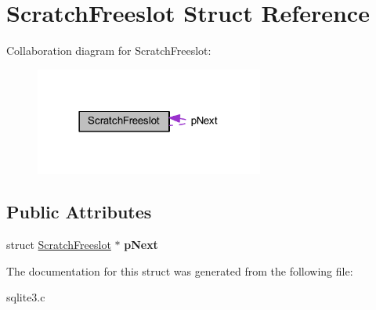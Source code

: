 \hypertarget{struct_scratch_freeslot}{\section{Scratch\-Freeslot Struct Reference}
\label{struct_scratch_freeslot}
}


Collaboration diagram for Scratch\-Freeslot\-:\nopagebreak
\begin{figure}[H]
\begin{center}
\leavevmode
\includegraphics[width=213pt]{struct_scratch_freeslot__coll__graph}
\end{center}
\end{figure}
\subsection*{Public Attributes}
\begin{DoxyCompactItemize}
\item 
\hypertarget{struct_scratch_freeslot_aca5c55a56a2a63a5be0756707a04bee8}{struct \hyperlink{struct_scratch_freeslot}{Scratch\-Freeslot} $\ast$ {\bfseries p\-Next}}\label{struct_scratch_freeslot_aca5c55a56a2a63a5be0756707a04bee8}

\end{DoxyCompactItemize}


The documentation for this struct was generated from the following file\-:\begin{DoxyCompactItemize}
\item 
sqlite3.\-c\end{DoxyCompactItemize}
